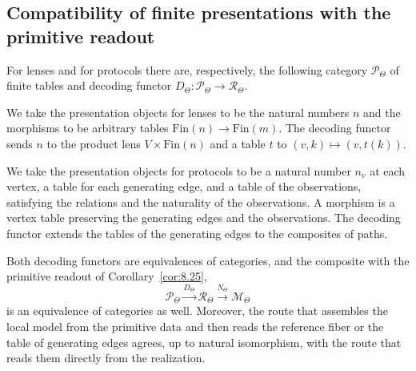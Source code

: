 \subsection*{Compatibility of finite presentations with the primitive readout}

\begin{corollary}\label{cor:8.30}

For lenses and for protocols there are, respectively, the following category
$\mathcal{P}_\Theta$ of finite tables and decoding functor
$D_\Theta:\mathcal{P}_\Theta\to\mathcal{R}_\Theta$.

We take the presentation objects for lenses to be the natural numbers $n$ and the morphisms to
be arbitrary tables $\mathrm{Fin}(n)\to\mathrm{Fin}(m)$.
The decoding functor sends $n$ to the product lens $V\times\mathrm{Fin}(n)$ and a table $t$ to
$(v,k)\mapsto(v,t(k))$.

We take the presentation objects for protocols to be a natural number $n_v$ at each vertex, a
table for each generating edge, and a table of the observations, satisfying the relations and
the naturality of the observations.
A morphism is a vertex table preserving the generating edges and the observations.
The decoding functor extends the tables of the generating edges to the composites of paths.

Both decoding functors are equivalences of categories, and the composite with the primitive
readout of Corollary~\ref{cor:8.25},
\begin{equation*}
\mathcal{P}_\Theta
\xrightarrow{D_\Theta}
\mathcal{R}_\Theta
\xrightarrow{N_\Theta}
\mathcal{M}_\Theta
\tag{8.27}\label{eq:8.27}
\end{equation*}
is an equivalence of categories as well.
Moreover, the route that assembles the local model from the primitive data and then reads the
reference fiber or the table of generating edges agrees, up to natural isomorphism, with the
route that reads them directly from the realization.

\end{corollary}

